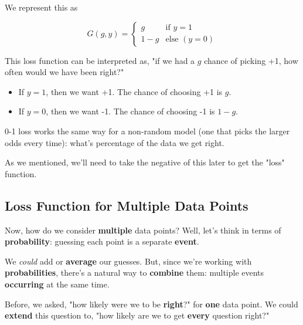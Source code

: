         We represent this as
        
        \begin{equation}
            G(g,y) = 
            \begin{cases}
                g & \text{if } y=1 \\
                1-g & \text{else } (y=0)
            \end{cases}
        \end{equation}

        \begin{remark}

            This loss function can be interpreted as, "if we had a $g$ chance of picking +1, how often would we have been right?"
    
            \begin{itemize}
                \item If $y=1$, then we want +1. The chance of choosing +1 is $g$.
                \item If $y=0$, then we want -1. The chance of choosing -1 is $1-g$.
            \end{itemize}
    
            0-1 loss works the same way for a non-random model (one that picks the larger odds every time): what's percentage of the data we get right.
        \end{remark}

        
        
        As we mentioned, we'll need to take the negative of this later to get the "loss" function.
        
        
    \subsection{Loss Function for Multiple Data Points}
    
        Now, how do we consider \textbf{multiple} data points? Well, let's think in terms of \textbf{probability}: guessing each point is a separate \textbf{event}.
        
        We \textit{could} add or \textbf{average} our guesses. But, since we're working with \textbf{probabilities}, there's a natural way to \textbf{combine} them: multiple events \textbf{occurring} at the same time.
        
        Before, we asked, "how likely were we to be \textbf{right}?" for \textbf{one} data point. We could \textbf{extend} this question to, "how likely are we to get \textbf{every} question right?"
        
